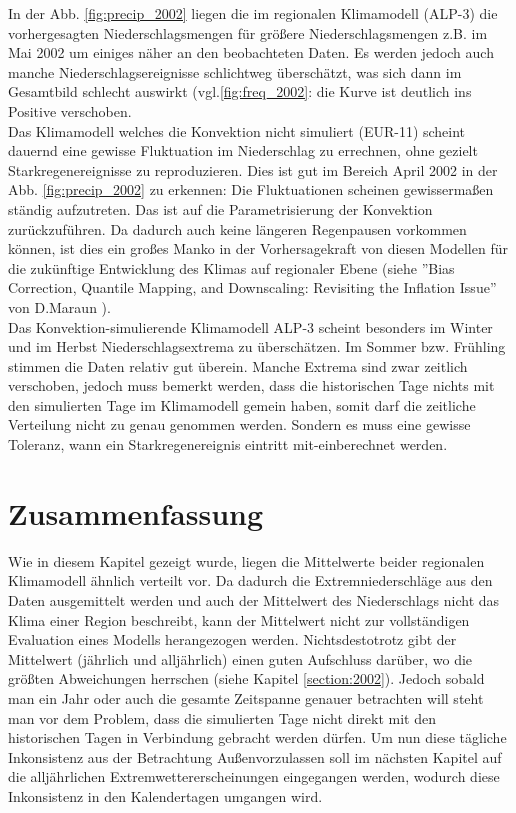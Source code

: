 In der Abb. \ref{fig:precip_2002} liegen die im regionalen Klimamodell (ALP-3) die vorhergesagten Niederschlagsmengen für größere Niederschlagsmengen z.B. im Mai 2002 um einiges näher an den beobachteten Daten. Es werden jedoch auch manche Niederschlagsereignisse schlichtweg überschätzt, was sich dann im Gesamtbild schlecht auswirkt (vgl.\ref{fig:freq_2002}: die Kurve ist deutlich ins Positive verschoben.\\
Das Klimamodell welches die Konvektion nicht simuliert (EUR-11) scheint dauernd eine gewisse Fluktuation im Niederschlag zu errechnen, ohne gezielt Starkregenereignisse zu reproduzieren. Dies ist gut im Bereich April 2002 in der Abb. \ref{fig:precip_2002} zu erkennen: Die Fluktuationen scheinen gewissermaßen ständig aufzutreten. Das ist auf die Parametrisierung der Konvektion zurückzuführen. Da dadurch auch keine längeren Regenpausen vorkommen können, ist dies ein großes Manko in der Vorhersagekraft von diesen Modellen für die zukünftige Entwicklung des Klimas auf regionaler Ebene (siehe ''Bias Correction, Quantile Mapping, and Downscaling: Revisiting the Inflation Issue'' von D.Maraun \cite{biasMaraun}). \\
Das Konvektion-simulierende Klimamodell ALP-3 scheint besonders im Winter und im Herbst Niederschlagsextrema zu überschätzen. Im Sommer  bzw. Frühling stimmen die Daten relativ gut überein. Manche Extrema sind zwar zeitlich verschoben, jedoch muss bemerkt werden, dass die historischen Tage nichts mit den simulierten Tage im Klimamodell gemein haben, somit darf die zeitliche Verteilung nicht zu genau genommen werden. Sondern es muss eine gewisse Toleranz, wann ein Starkregenereignis eintritt mit-einberechnet werden.\\
\section{Zusammenfassung}
Wie in diesem Kapitel gezeigt wurde, liegen die Mittelwerte beider regionalen Klimamodell ähnlich verteilt vor. Da dadurch die Extremniederschläge aus den Daten ausgemittelt werden und auch der Mittelwert des Niederschlags nicht das Klima einer Region beschreibt, kann der Mittelwert nicht zur vollständigen Evaluation eines Modells herangezogen werden. Nichtsdestotrotz gibt der Mittelwert (jährlich und alljährlich) einen guten Aufschluss darüber, wo die größten Abweichungen herrschen (siehe Kapitel \ref{section:2002}). Jedoch sobald man ein Jahr oder auch die gesamte Zeitspanne genauer betrachten will steht man vor dem Problem, dass die simulierten Tage nicht direkt mit den historischen Tagen in Verbindung gebracht werden dürfen. Um nun diese tägliche Inkonsistenz aus der Betrachtung Außenvorzulassen soll im nächsten Kapitel auf die alljährlichen Extremwettererscheinungen eingegangen werden, wodurch diese Inkonsistenz in den Kalendertagen umgangen wird.